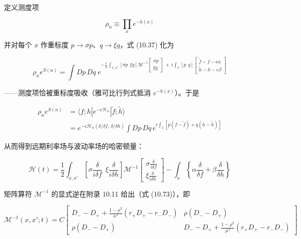 定义测度项

\begin{equation*}
\rho_n\equiv\prod_x e^{-h(x)}
\tag{10.38}
\end{equation*}

并对每个 $x$ 作重标度 $p\to\sigma p$、$q\to\xi q$，式 (10.37) 化为

\begin{equation*}
\rho_n e^{S(n)}=\int Dp\,Dq\;e^{-\frac{\epsilon}{2}\int_{x,x'}\left[\sigma p\ \ \xi q\right]\mathcal{M}^{-1}\begin{bmatrix}\sigma p\\ \xi q\end{bmatrix}\,+\,i\int_x\left[p\ \ q\right]\begin{bmatrix}\tilde{f}-f-\epsilon\alpha\\ \tilde{h}-h-\epsilon\beta\end{bmatrix}}
\end{equation*}

——测度项恰被重标度吸收（雅可比行列式抵消 $e^{-h(x)}$）。于是

\begin{equation*}
\begin{aligned}
\rho_n e^{S(n)}&=\langle f;h|e^{-\epsilon\mathcal{H}_n}|\tilde{f};\tilde{h}\rangle\\
&=e^{-\epsilon\mathcal{H}_n(\delta/\delta f,\,\delta/\delta h)}\int Dp\,Dq\,e^{i\int_x[p(f-\tilde{f})+q(h-\tilde{h})]}
\end{aligned}
\tag{10.39}
\end{equation*}

从而得到远期利率场与波动率场的哈密顿量：

\begin{equation*}
\mathcal{H}(t)=\frac{1}{2}\int_{x,x'}\left[\sigma\frac{\delta}{i\delta f}\ \ \xi\frac{\delta}{i\delta h}\right]\mathcal{M}^{-1}\begin{bmatrix}\sigma\frac{\delta}{i\delta f}\\[4pt] \xi\frac{\delta}{i\delta h}\end{bmatrix}-\int_x\left\{\alpha\frac{\delta}{\delta f}+\beta\frac{\delta}{\delta h}\right\}
\tag{10.40}
\end{equation*}

矩阵算符 $\mathcal{M}^{-1}$ 的显式逆在附录 10.11 给出（式 (10.73)），即

\begin{equation*}
\mathcal{M}^{-1}(x,x';t)=
C\begin{bmatrix}
D_--D_+ + \frac{1-\rho^2}{\kappa^2}(r_+D_+-r_-D_-) & \rho(D_--D_+)\\[6pt]
\rho(D_--D_+) & D_--D_+ + \frac{1-\rho^2}{\mu^2}(r_+D_+-r_-D_-)
\end{bmatrix}
\tag{10.41}
\end{equation*}

